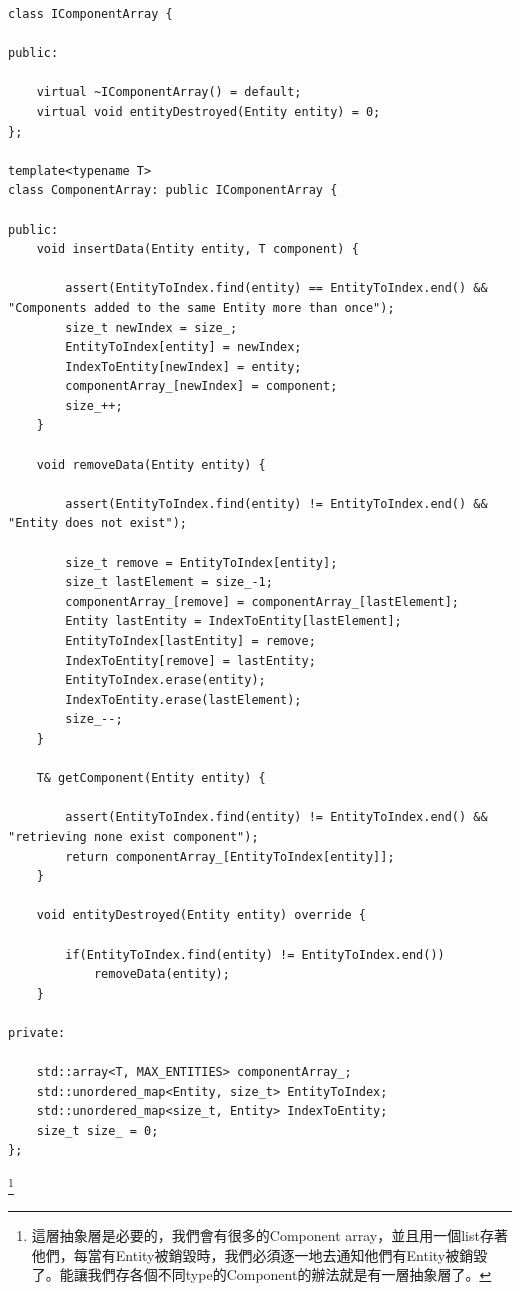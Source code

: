 \begin{lstlisting}
class IComponentArray {

public:

    virtual ~IComponentArray() = default;
    virtual void entityDestroyed(Entity entity) = 0;
};

template<typename T>
class ComponentArray: public IComponentArray {

public:
    void insertData(Entity entity, T component) {

        assert(EntityToIndex.find(entity) == EntityToIndex.end() && "Components added to the same Entity more than once");
        size_t newIndex = size_;
        EntityToIndex[entity] = newIndex;
        IndexToEntity[newIndex] = entity;
        componentArray_[newIndex] = component;
        size_++;
    }

    void removeData(Entity entity) {

        assert(EntityToIndex.find(entity) != EntityToIndex.end() && "Entity does not exist");

        size_t remove = EntityToIndex[entity];
        size_t lastElement = size_-1;
        componentArray_[remove] = componentArray_[lastElement];
        Entity lastEntity = IndexToEntity[lastElement];
        EntityToIndex[lastEntity] = remove;
        IndexToEntity[remove] = lastEntity;
        EntityToIndex.erase(entity);
        IndexToEntity.erase(lastElement);
        size_--;
    }

    T& getComponent(Entity entity) {

        assert(EntityToIndex.find(entity) != EntityToIndex.end() && "retrieving none exist component");
        return componentArray_[EntityToIndex[entity]];
    }

    void entityDestroyed(Entity entity) override {

        if(EntityToIndex.find(entity) != EntityToIndex.end())
            removeData(entity);
    }

private:

    std::array<T, MAX_ENTITIES> componentArray_;
    std::unordered_map<Entity, size_t> EntityToIndex;
    std::unordered_map<size_t, Entity> IndexToEntity;
    size_t size_ = 0;
};
\end{lstlisting}

\footnote{這層抽象層是必要的，我們會有很多的Component array，並且用一個list存著他們，每當有Entity被銷毀時，我們必須逐一地去通知他們有Entity被銷毀了。能讓我們存各個不同type的Component的辦法就是有一層抽象層了。}


